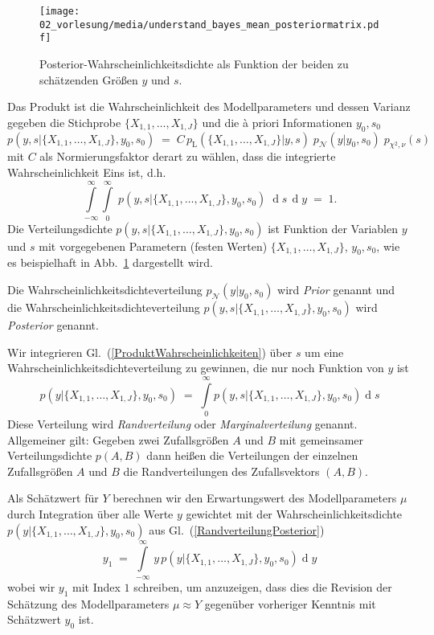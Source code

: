\begin{figure}
\begin{center}
\texttt{[image: 02\_vorlesung/media/understand\_bayes\_mean\_posteriormatrix.pdf]}
\caption{\label{posteriormatrix} Posterior-Wahrscheinlichkeitsdichte als Funktion
der beiden zu schätzenden Größen $y$ und $s$.}
\end{center}
\end{figure}
Das Produkt ist die Wahrscheinlichkeit des Modellparameters und dessen Varianz gegeben
die Stichprobe $\{X_{1,1}, \dots, X_{1,J}\}$ und die {\`a} priori Informationen $y_0, s_0$
\begin{equation}
p(y, s | \{X_{1,1}, \dots, X_{1,J}\}, y_0, s_0) \; = \; C \,
p_\mathrm{L}(\{X_{1,1}, \dots, X_{1,J}\} | y, s) \; p_\mathcal{N}(y | y_0, s_0) \; p_{\chi^2,\nu}(s)
\label{ProduktWahrscheinlichkeiten}
\end{equation}
mit $C$ als Normierungsfaktor derart zu wählen, dass die integrierte Wahrscheinlichkeit Eins ist, d.h.
$$
\int\limits_{-\infty}^\infty  \int\limits_0^\infty \; p(y, s | \{X_{1,1}, \dots, X_{1,J}\}, y_0, s_0) \;
\operatorname{d}s \, \operatorname{d}y \; = \; 1 .
$$
Die Verteilungsdichte $p(y, s | \{X_{1,1}, \dots, X_{1,J}\}, y_0, s_0)$ ist Funktion der
Variablen $y$ und $s$ mit vorgegebenen Parametern 
(festen Werten) $\{X_{1,1}, \dots, X_{1,J}\}$, $y_0, s_0$, wie es beispielhaft in 
Abb.~\ref{posteriormatrix} dargestellt wird.

Die Wahrscheinlichkeitsdichteverteilung
$p_\mathcal{N}(y | y_0, s_0)$ wird \textsl{Prior} genannt und die
Wahr\-schein\-lich\-keits\-dichte\-ver\-teilung $p(y, s | \{X_{1,1}, \dots, X_{1,J}\}, y_0, s_0)$
wird \textsl{Posterior} genannt.

Wir integrieren Gl.~(\ref{ProduktWahrscheinlichkeiten}) über $s$ um eine 
Wahrscheinlichkeits\-dichte\-verteilung zu gewinnen, die nur noch Funktion von $y$ ist
\begin{equation}
p(y | \{X_{1,1}, \dots, X_{1,J}\}, y_0, s_0)  \; = \;
\int\limits_0^\infty p(y, s | \{X_{1,1}, \dots, X_{1,J}\}, y_0, s_0) \operatorname{d}s
\label{RandverteilungPosterior}
\end{equation}
Diese Verteilung wird \textsl{Randverteilung} oder \textsl{Marginalverteilung} genannt.
Allgemeiner gilt: Gegeben zwei Zufallsgrößen $A$ und $B$ mit gemeinsamer Verteilungsdichte
$p(A, B)$ dann heißen die Verteilungen der einzelnen Zufallsgrößen
$A$ und $B$ die Randverteilungen des Zufallsvektors $(A, B)$.

Als Schätzwert für $Y$ berechnen wir den Erwartungswert des Modellparameters $\mu$
durch Integration über alle Werte $y$ gewichtet mit der Wahrscheinlichkeitsdichte\\
$p(y | \{X_{1,1}, \dots, X_{1,J}\}, y_0, s_0)$ aus Gl.~(\ref{RandverteilungPosterior})
\begin{equation}
y_1 \; = \; \int\limits_{-\infty}^\infty \, y \, p(y | \{X_{1,1}, \dots, X_{1,J}\}, y_0, s_0) 
\operatorname{d}y
\end{equation}
wobei wir $y_1$ mit Index $1$ schreiben, um anzuzeigen, dass dies die Revision der Schätzung des 
Modellparameters $\mu \approx Y$ gegenüber vorheriger Kenntnis mit Schätzwert $y_0$ ist.

